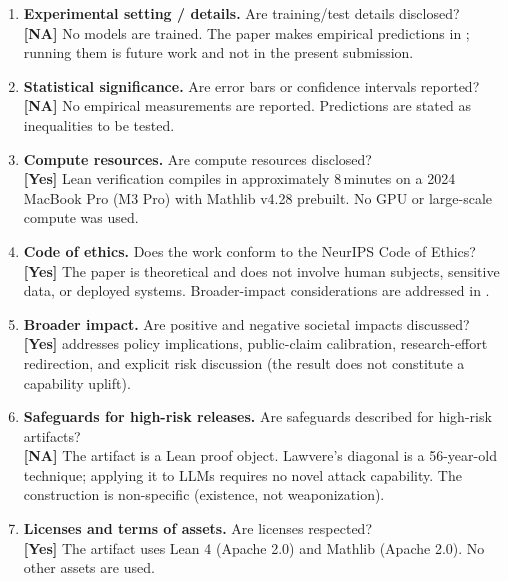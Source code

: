 \begin{enumerate}[leftmargin=1.9em,itemsep=0.25em]
\item \textbf{Experimental setting / details.} Are training/test details disclosed?\\
\textbf{[NA]} No models are trained. The paper makes empirical predictions in ; running them is future work and not in the present submission.

\item \textbf{Statistical significance.} Are error bars or confidence intervals reported?\\
\textbf{[NA]} No empirical measurements are reported. Predictions are stated as inequalities to be tested.

\item \textbf{Compute resources.} Are compute resources disclosed?\\
\textbf{[Yes]} Lean verification compiles in approximately 8\,minutes on a 2024 MacBook Pro (M3 Pro) with Mathlib v4.28 prebuilt. No GPU or large-scale compute was used.

\item \textbf{Code of ethics.} Does the work conform to the NeurIPS Code of Ethics?\\
\textbf{[Yes]} The paper is theoretical and does not involve human subjects, sensitive data, or deployed systems. Broader-impact considerations are addressed in .

\item \textbf{Broader impact.} Are positive and negative societal impacts discussed?\\
\textbf{[Yes]}  addresses policy implications, public-claim calibration, research-effort redirection, and explicit risk discussion (the result does not constitute a capability uplift).

\item \textbf{Safeguards for high-risk releases.} Are safeguards described for high-risk artifacts?\\
\textbf{[NA]} The artifact is a Lean proof object. Lawvere's diagonal is a 56-year-old technique; applying it to LLMs requires no novel attack capability. The construction is non-specific (existence, not weaponization).

\item \textbf{Licenses and terms of assets.} Are licenses respected?\\
\textbf{[Yes]} The artifact uses Lean 4 (Apache 2.0) and Mathlib (Apache 2.0). No other assets are used.


\end{enumerate}
